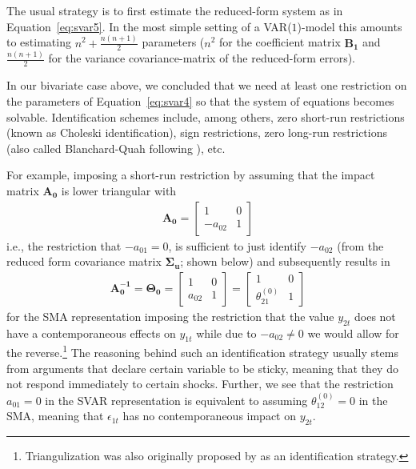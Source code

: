 \documentclass[a4paper,11pt,listof=nochaptergap,oneside,pointednumbers,bibtotoc,bigheadings,liststotoc]{scrbook}
\theoremstyle{mysatz}
\theoremstyle{mydefinition}
\theoremstyle{mytheorem}
\theoremstyle{mybemerkung}
\newcommand{\vect}[1]{\boldsymbol{\mathbf{#1}}}
\begin{document}
The usual strategy is to first estimate the reduced-form system as in Equation~\ref{eq:svar5}. In the most simple setting of a VAR($1$)-model this amounts to estimating $n^2 + \frac{n(n+1)}{2}$ parameters ($n^2$ for the coefficient matrix $\vect{B_1}$ and $\frac{n(n+1)}{2}$ for the variance covariance-matrix of the reduced-form errors). 

In our bivariate case above, we concluded that we need at least one restriction on the parameters of Equation~\ref{eq:svar4} so that the system of equations becomes solvable. Identification schemes include, among others, zero short-run restrictions (known as Choleski identification), sign restrictions, zero long-run restrictions (also called Blanchard-Quah following \citealp{blanchardandquah:89}), etc.

For example, imposing a short-run restriction by assuming that the impact matrix $\vect{A_0}$ is lower triangular with
\begin{equation} \label{eq:svar11}
\begin{split}
 		\vect{A_0} = 	\begin{bmatrix}
    					1 & 0 \\
					-a_{02} & 1
 					\end{bmatrix}
\end{split}								
\end{equation}
i.e., the restriction that $-a_{01}=0$, is sufficient to just identify $-a_{02}$ (from the reduced form covariance matrix $\vect{\Sigma_u}$; shown below) and subsequently results in 
\begin{equation} \label{eq:svar12}
\begin{split}
 		\vect{A_0^{-1}} = \vect{\Theta_0} = 	
					\begin{bmatrix}
    					1 & 0 \\
					a_{02} & 1
 					\end{bmatrix} = 
						\begin{bmatrix}
    						1 & 0 \\
						\theta_{21}^{(0)} & 1
 						\end{bmatrix}
\end{split}								
\end{equation}
for the SMA representation imposing the restriction that the value $y_{2t}$ does not have a contemporaneous effects on $y_{1t}$ while due to $-a_{02} \neq 0$ we would allow for the reverse.\footnote{Triangulization was also originally proposed by \citet{sims:80} as an identification strategy.} The reasoning behind such an identification strategy usually stems from arguments that declare certain variable to be sticky, meaning that they do not respond immediately to certain shocks. Further, we see that the restriction $a_{01}=0$ in the SVAR representation is equivalent to assuming $\theta_{12}^{(0)}=0$ in the SMA, meaning that $\epsilon_{1t}$ has no contemporaneous impact on $y_{2t}$.
\end{document}
